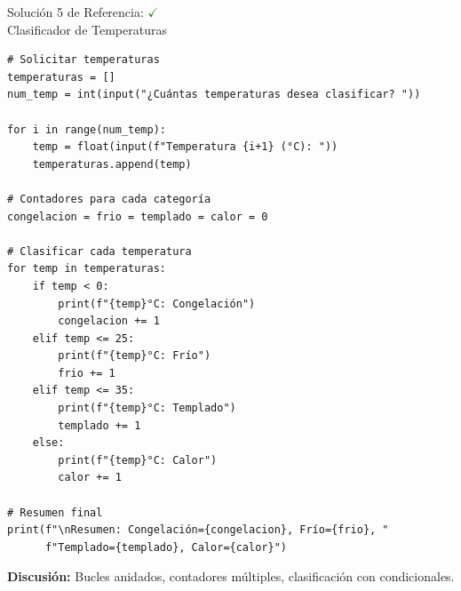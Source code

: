 \documentclass[10pt]{beamer}
\begin{document}
\begin{frame}[fragile]{Solución 5 de Referencia: \hfill \textcolor{green}{$\checkmark$} \\ Clasificador de Temperaturas}
\begin{verbatim}
# Solicitar temperaturas
temperaturas = []
num_temp = int(input("¿Cuántas temperaturas desea clasificar? "))

for i in range(num_temp):
    temp = float(input(f"Temperatura {i+1} (°C): "))
    temperaturas.append(temp)

# Contadores para cada categoría
congelacion = frio = templado = calor = 0

# Clasificar cada temperatura
for temp in temperaturas:
    if temp < 0:
        print(f"{temp}°C: Congelación")
        congelacion += 1
    elif temp <= 25:
        print(f"{temp}°C: Frío")
        frio += 1
    elif temp <= 35:
        print(f"{temp}°C: Templado")
        templado += 1
    else:
        print(f"{temp}°C: Calor")
        calor += 1

# Resumen final
print(f"\nResumen: Congelación={congelacion}, Frío={frio}, "
      f"Templado={templado}, Calor={calor}")
\end{verbatim}
\vspace{-0.4em}
{\scriptsize \textbf{Discusión:} Bucles anidados, contadores múltiples, clasificación con condicionales.}
\end{frame}
\fi


\end{document}
